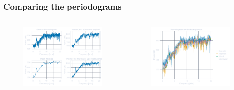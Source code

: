 \documentclass[compress]{beamer}
\begin{document}
\begin{frame} %
    \frametitle{Comparing the periodograms}
    \begin{columns}
        \begin{column}{0.5\textwidth}
            \begin{figure}
                \includegraphics[width=\columnwidth]{"../1e.pdf"}
            \end{figure}
        \end{column}
        \begin{column}{0.5\textwidth}
            \begin{figure}
                \includegraphics[width=\columnwidth]{"../1f.pdf"}
            \end{figure}
        \end{column}
    \end{columns}
\end{frame} %
\end{document}
